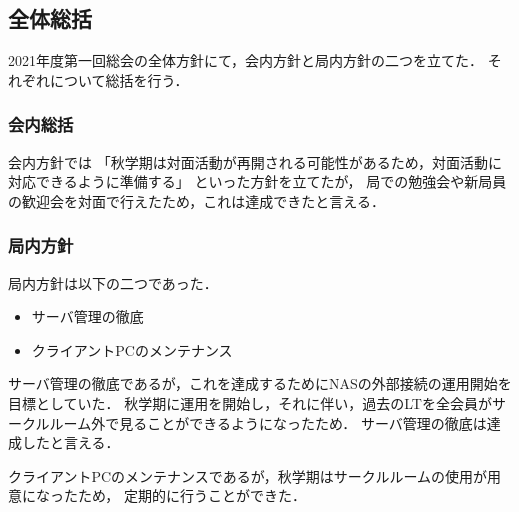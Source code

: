 \subsection*{全体総括}


2021年度第一回総会の全体方針にて，会内方針と局内方針の二つを立てた．
それぞれについて総括を行う．

\subsubsection*{会内総括}
会内方針では
「秋学期は対面活動が再開される可能性があるため，対面活動に対応できるように準備する」
といった方針を立てたが，
局での勉強会や新局員の歓迎会を対面で行えたため，これは達成できたと言える．

\subsubsection*{局内方針}

局内方針は以下の二つであった．
\begin{itemize}
    \item サーバ管理の徹底
    \item クライアントPCのメンテナンス
\end{itemize}

サーバ管理の徹底であるが，これを達成するためにNASの外部接続の運用開始を目標としていた．
秋学期に運用を開始し，それに伴い，過去のLTを全会員がサークルルーム外で見ることができるようになったため．
サーバ管理の徹底は達成したと言える．

クライアントPCのメンテナンスであるが，秋学期はサークルルームの使用が用意になったため，
定期的に行うことができた．
